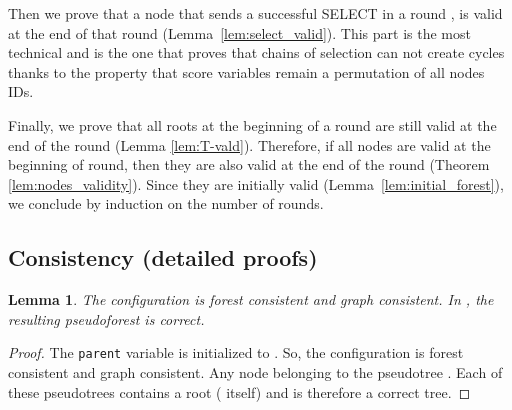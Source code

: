 \documentclass[twocolumn]{article}
\newtheorem{lemma}{Lemma}
\begin{document}
Then we prove that a node that sends a successful SELECT in a round , is valid at the end of that 
round (Lemma~\ref{lem:select_valid}). This part is the most technical and is the one that proves that chains of selection can not create cycles thanks to the property that score variables remain a permutation of all nodes IDs.

Finally, we prove that all roots at the beginning of a round
are still valid at the end of the round (Lemma \ref{lem:T-vald}).
Therefore, if all nodes are valid at the beginning of round, 
then they are also valid at the end of the round 
(Theorem \ref{lem:nodes_validity}). Since they are initially valid (Lemma~\ref{lem:initial_forest}), we conclude by induction on the number of rounds.










































































\subsection{Consistency (detailed proofs)}
\begin{lemma}
  \label{lem:C0-forestConsistency}
  \label{lem:initial_forest}
The configuration  is forest consistent and graph consistent.
In , the resulting pseudoforest is correct.
\end{lemma}
\begin{proof}
  The {\tt parent} variable is initialized to . So, the configuration  is forest consistent and graph consistent.
Any node  belonging to the pseudotree . 
Each of these pseudotrees contains  a root ( itself) and is therefore a correct tree.
 \end{proof}
\end{document}
